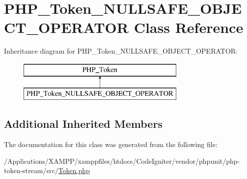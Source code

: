 \hypertarget{class_p_h_p___token___n_u_l_l_s_a_f_e___o_b_j_e_c_t___o_p_e_r_a_t_o_r}{}\section{P\+H\+P\+\_\+\+Token\+\_\+\+N\+U\+L\+L\+S\+A\+F\+E\+\_\+\+O\+B\+J\+E\+C\+T\+\_\+\+O\+P\+E\+R\+A\+T\+OR Class Reference}
\label{class_p_h_p___token___n_u_l_l_s_a_f_e___o_b_j_e_c_t___o_p_e_r_a_t_o_r}
Inheritance diagram for P\+H\+P\+\_\+\+Token\+\_\+\+N\+U\+L\+L\+S\+A\+F\+E\+\_\+\+O\+B\+J\+E\+C\+T\+\_\+\+O\+P\+E\+R\+A\+T\+OR\+:\begin{figure}[H]
\begin{center}
\leavevmode
\includegraphics[height=2.000000cm]{class_p_h_p___token___n_u_l_l_s_a_f_e___o_b_j_e_c_t___o_p_e_r_a_t_o_r}
\end{center}
\end{figure}
\subsection*{Additional Inherited Members}


The documentation for this class was generated from the following file\+:\begin{DoxyCompactItemize}
\item 
/\+Applications/\+X\+A\+M\+P\+P/xamppfiles/htdocs/\+Code\+Igniter/vendor/phpunit/php-\/token-\/stream/src/\mbox{\hyperlink{_token_8php}{Token.\+php}}\end{DoxyCompactItemize}
